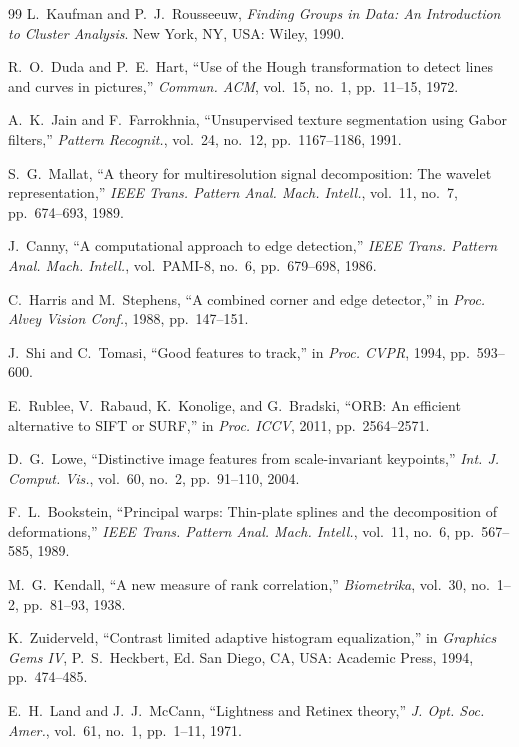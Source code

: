 \documentclass[conference]{IEEEtran}
\begin{document}
\begin{thebibliography}{99}
L.~Kaufman and P.~J.~Rousseeuw, \emph{Finding Groups in Data: An Introduction to Cluster Analysis}. New York, NY, USA: Wiley, 1990.

R.~O.~Duda and P.~E.~Hart, ``Use of the Hough transformation to detect lines and curves in pictures,'' \emph{Commun. ACM}, vol.~15, no.~1, pp.~11--15, 1972.

A.~K.~Jain and F.~Farrokhnia, ``Unsupervised texture segmentation using Gabor filters,'' \emph{Pattern Recognit.}, vol.~24, no.~12, pp.~1167--1186, 1991.

S.~G.~Mallat, ``A theory for multiresolution signal decomposition: The wavelet representation,'' \emph{IEEE Trans. Pattern Anal. Mach. Intell.}, vol.~11, no.~7, pp.~674--693, 1989.

J.~Canny, ``A computational approach to edge detection,'' \emph{IEEE Trans. Pattern Anal. Mach. Intell.}, vol.~PAMI-8, no.~6, pp.~679--698, 1986.

C.~Harris and M.~Stephens, ``A combined corner and edge detector,'' in \emph{Proc. Alvey Vision Conf.}, 1988, pp.~147--151.

J.~Shi and C.~Tomasi, ``Good features to track,'' in \emph{Proc. CVPR}, 1994, pp.~593--600.

E.~Rublee, V.~Rabaud, K.~Konolige, and G.~Bradski, ``ORB: An efficient alternative to SIFT or SURF,'' in \emph{Proc. ICCV}, 2011, pp.~2564--2571.

D.~G.~Lowe, ``Distinctive image features from scale-invariant keypoints,'' \emph{Int. J. Comput. Vis.}, vol.~60, no.~2, pp.~91--110, 2004.

F.~L.~Bookstein, ``Principal warps: Thin-plate splines and the decomposition of deformations,'' \emph{IEEE Trans. Pattern Anal. Mach. Intell.}, vol.~11, no.~6, pp.~567--585, 1989.

M.~G.~Kendall, ``A new measure of rank correlation,'' \emph{Biometrika}, vol.~30, no.~1--2, pp.~81--93, 1938.

K.~Zuiderveld, ``Contrast limited adaptive histogram equalization,'' in \emph{Graphics Gems IV}, P.~S.~Heckbert, Ed. San Diego, CA, USA: Academic Press, 1994, pp.~474--485.

E.~H.~Land and J.~J.~McCann, ``Lightness and Retinex theory,'' \emph{J. Opt. Soc. Amer.}, vol.~61, no.~1, pp.~1--11, 1971.

\end{thebibliography}
\end{document}
